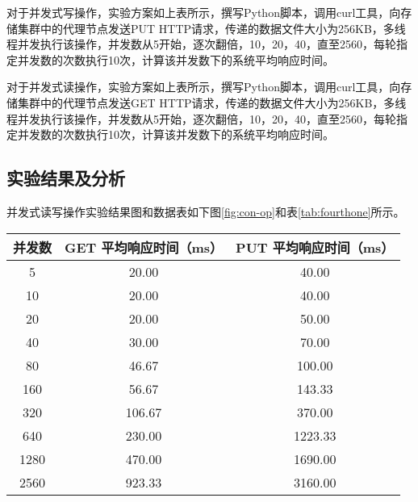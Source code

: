 对于并发式写操作，实验方案如上表所示，撰写Python脚本，调用curl工具，向存储集群中的代理节点发送PUT HTTP请求，传递的数据文件大小为256KB，多线程并发执行该操作，并发数从5开始，逐次翻倍，10，20，40，直至2560，每轮指定并发数的次数执行10次，计算该并发数下的系统平均响应时间。

对于并发式读操作，实验方案如上表所示，撰写Python脚本，调用curl工具，向存储集群中的代理节点发送GET HTTP请求，传递的数据文件大小为256KB，多线程并发执行该操作，并发数从5开始，逐次翻倍，10，20，40，直至2560，每轮指定并发数的次数执行10次，计算该并发数下的系统平均响应时间。

\subsection{实验结果及分析}
并发式读写操作实验结果图和数据表如下图\ref{fig:con-op}和表\ref{tab:fourthone}所示。
\begin{figure}[!htp]
  \centering
  \hspace{1in}
\end{figure}

\begin{table}[!hpb]
  \centering
  \begin{tabular}{|c|c|c|}
  \hline
  并发数 & GET 平均响应时间（ms） & PUT 平均响应时间（ms）\\
  \hline
  5 & 20.00 & 40.00\\
  \hline
  10 & 20.00 & 40.00\\
  \hline
  20 & 20.00 & 50.00\\
  \hline
  40 & 30.00 & 70.00\\
  \hline
  80 & 46.67 & 100.00\\
  \hline
  160 & 56.67 & 143.33\\
  \hline
  320 & 106.67 & 370.00\\
  \hline
  640 & 230.00 & 1223.33\\
  \hline
  1280 & 470.00 & 1690.00\\
  \hline
  2560 & 923.33 & 3160.00\\
  \hline
  \end{tabular}
\end{table}

